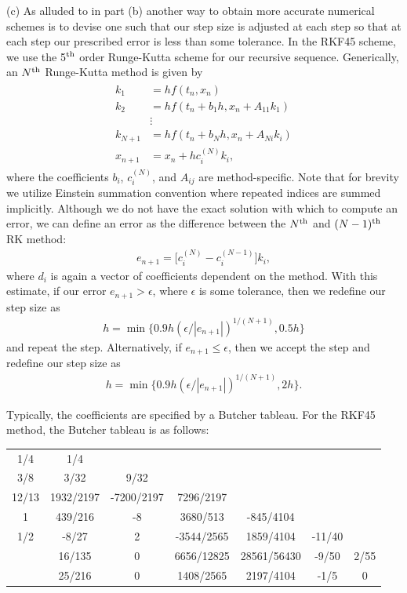 {(c) As alluded to in part (b) another way to obtain more accurate numerical schemes is to devise one such that our step size is adjusted at each step so that at each step our prescribed error is less than some tolerance.
In the RKF45 scheme, we use the 5$^{\rm th}$ order Runge-Kutta scheme for our recursive sequence.
Generically, an $N^{\rm th}$ Runge-Kutta method is given by
\begin{align}
\begin{aligned} 
    k_1 &= h f(t_{n},x_{n}) \\
    k_2 &= h f(t_{n} + b_{1} h, x_{n} + A_{11} k_1) \\
    &\vdots \\
    k_{N+1} &= h f(t_{n} + b_{N} h, x_{n} + A_{Ni} k_{i}) \\
    x_{n+1} &= x_{n} + h c_{i}^{(N)} k_{i}
,\end{aligned}
\end{align}
where the coefficients $b_{i}$, $c_{i}^{(N)}$, and $A_{ij}$ are method-specific.
Note that for brevity we utilize Einstein summation convention where repeated indices are summed implicitly.
Although we do not have the exact solution with which to compute an error, we can define an error as the difference between the $N^{\rm th}$ and $(N - 1)^{\rm th}$ RK method:
\begin{align}
    e_{n+1} = \Big[ c_{i}^{(N)} - c_{i}^{(N-1)} \Big] k_{i}
,\end{align}
where $d_{i}$ is again a vector of coefficients dependent on the method.
With this estimate, if our error $e_{n+1} > \epsilon$, where $\epsilon$ is some tolerance, then we redefine our step size as
\begin{align}
    h = \min\{ 0.9 h (\epsilon/|e_{n+1}|)^{1/(N+1)}, 0.5 h \}
\end{align}
and repeat the step.
Alternatively, if $e_{n+1} \leq \epsilon$, then we accept the step and redefine our step size as
\begin{align}
    h = \min\{ 0.9 h (\epsilon/|e_{n+1}|)^{1/(N+1)},2h \}
.\end{align}

Typically, the coefficients are specified by a Butcher tableau.
For the RKF45 method, the Butcher tableau is as follows:
\begin{table}[H]
    \centering
    \begin{tabular}{c|cccccc}
        1/4 & 1/4 &  &  &  &  & \\
        3/8 & 3/32 & 9/32 &  &  & &  \\
        12/13 & 1932/2197 & -7200/2197 & 7296/2197 & & &  \\
        1 & 439/216 & -8 & 3680/513 & -845/4104 & & \\
        1/2 & -8/27 & 2 & -3544/2565 & 1859/4104 & -11/40  & \\
        \hline
         & 16/135 & 0 & 6656/12825 & 28561/56430 & -9/50 & 2/55 \\
         & 25/216 & 0 & 1408/2565 & 2197/4104 & -1/5 & 0
    \end{tabular}
\end{table}


}

